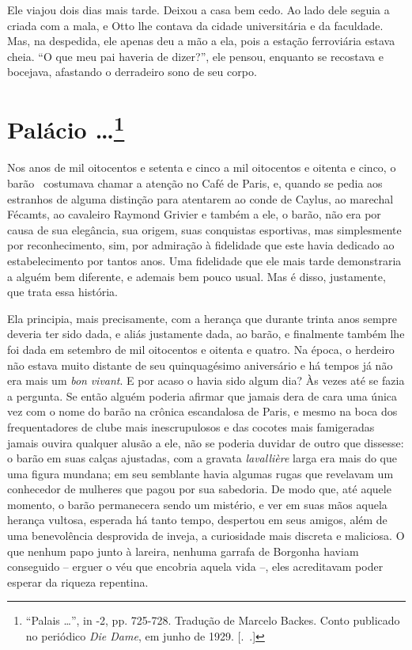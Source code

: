 Ele viajou dois dias mais tarde. Deixou a casa bem cedo. Ao lado dele
seguia a criada com a mala, e Otto lhe contava da cidade universitária e
da faculdade. Mas, na despedida, ele apenas deu a mão a ela, pois a
estação ferroviária estava cheia. ``O que meu pai haveria de dizer?'',
ele pensou, enquanto se recostava e bocejava, afastando o derradeiro
sono de seu corpo.

\chapter{Palácio \ldots{}\footnote[*]{``Palais \ldots{}'', in  -2, pp.
  725-728. Tradução de Marcelo Backes. Conto publicado no periódico
  \emph{Die Dame}, em junho de 1929. [.~.]} }

Nos anos de mil oitocentos e setenta e cinco a mil oitocentos e oitenta
e cinco, o barão~ costumava chamar a atenção no Café de Paris, e,
quando se pedia aos estranhos de alguma distinção para atentarem ao
conde de Caylus, ao marechal Fécamts, ao cavaleiro Raymond Grivier e
também a ele, o barão, não era por causa de sua elegância, sua origem,
suas conquistas esportivas, mas simplesmente por reconhecimento, sim,
por admiração à fidelidade que este havia dedicado ao estabelecimento
por tantos anos. Uma fidelidade que ele mais tarde demonstraria a alguém
bem diferente, e ademais bem pouco usual. Mas é disso, justamente, que
trata essa história.

Ela principia, mais precisamente, com a herança que durante trinta anos
sempre deveria ter sido dada, e aliás justamente dada, ao barão, e
finalmente também lhe foi dada em setembro de mil oitocentos e oitenta e
quatro. Na época, o herdeiro não estava muito distante de seu
quinquagésimo aniversário e há tempos já não era mais um \emph{bon}
\emph{vivant}. E por acaso o havia sido algum dia? Às vezes até se fazia
a pergunta. Se então alguém poderia afirmar que jamais dera de cara uma
única vez com o nome do barão na crônica escandalosa de Paris, e mesmo
na boca dos frequentadores de clube mais inescrupulosos e das cocotes
mais famigeradas jamais ouvira qualquer alusão a ele, não se poderia
duvidar de outro que dissesse: o barão em suas calças ajustadas, com a
gravata \emph{lavallière} larga era mais do que uma figura mundana; em
seu semblante havia algumas rugas que revelavam um conhecedor de
mulheres que pagou por sua sabedoria. De modo que, até aquele momento, o
barão permanecera sendo um mistério, e ver em suas mãos aquela herança
vultosa, esperada há tanto tempo, despertou em seus amigos, além de uma
benevolência desprovida de inveja, a curiosidade mais discreta e
maliciosa. O que nenhum papo junto à lareira, nenhuma garrafa de
Borgonha haviam conseguido -- erguer o véu que encobria aquela vida --,
eles acreditavam poder esperar da riqueza repentina.

